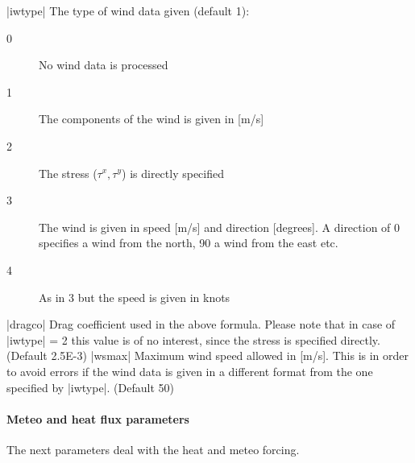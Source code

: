 |iwtype|      The type of wind data given (default 1):
\begin{description}
\item[0] No wind data is processed
\item[1] The components of the wind is given in [m/s]
\item[2] The stress ($\tau^x,\tau^y$) is directly specified
\item[3] The wind is given in speed [m/s] and direction
[degrees]. A direction of 0\degrees{} specifies
a wind from the north, 90\degrees{} a wind
from the east etc.
\item[4] As in 3 but the speed is given in knots
\end{description}
\par
|dragco|      Drag coefficient used in the above formula.
Please note that in case
of |iwtype| = 2 this value is of no interest, since the
stress is specified directly. (Default 2.5E-3)
|wsmax|       Maximum wind speed allowed in [m/s]. This is in order to avoid
errors if the wind data is given in a different format
from the one specified by |iwtype|. (Default 50)

\par

\paragraph{Meteo and heat flux parameters}
The next parameters deal with the heat and meteo forcing.

